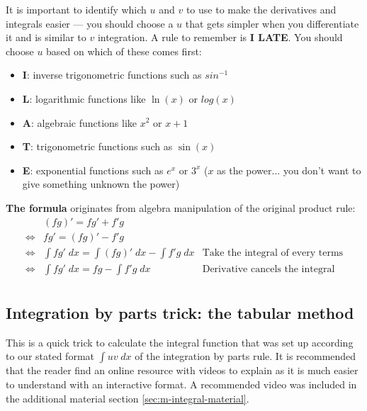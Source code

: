 It is important to identify which $u$ and $v$ to use to make the derivatives and integrals easier — you should choose a $u$ that gets simpler when you differentiate it and is similar to $v$ integration. A rule to remember is \textbf{I LATE}. You should choose $u$ based on which of these comes first:
\begin{itemize}
    \item \textbf{I}: inverse trigonometric functions such as $sin^{-1}$
    \item \textbf{L}: logarithmic functions like $\ln(x)$ or $log(x)$
    \item \textbf{A}: algebraic functions like $x^2$ or $x+1$
    \item \textbf{T}: trigonometric functions such as $\sin(x)$
    \item \textbf{E}: exponential functions such as $e^x$ or $3^x$ ($x$ as the power... you don't want to give something unknown the power)
\end{itemize}

\textbf{The formula} originates from algebra manipulation of the original product rule:
\[\begin{aligned}
    &(fg)' = fg'+f'g \\
    \Leftrightarrow& fg' = (fg)'-f'g \\
    \Leftrightarrow&\int fg'\;dx = \int(fg)'\;dx-\int f'g\;dx 
        &\text{Take the integral of every terms}\\
    \Leftrightarrow&\int fg'\;dx = fg -\int f'g\;dx
        &\text{Derivative cancels the integral}\\
\end{aligned}\]

\subsection{Integration by parts trick: the tabular method}
This is a quick trick to calculate the integral function that was set up according to our stated format $\int uv\;dx$ of the integration by parts rule. It is recommended that the reader find an online resource with videos to explain as it is much easier to understand with an interactive format. A recommended video was included in the additional material section \ref{sec:m-integral-material}.


